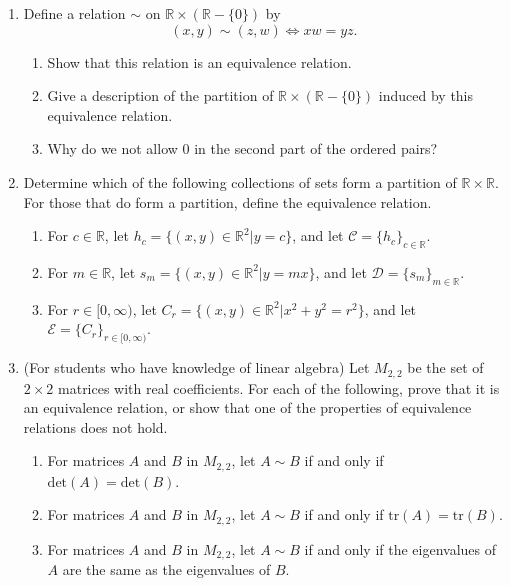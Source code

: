 \documentclass[
]{book}
\providecommand{\tightlist}{%
  \setlength{\itemsep}{0pt}\setlength{\parskip}{0pt}}
\theoremstyle{definition}
\theoremstyle{definition}
\theoremstyle{definition}
\theoremstyle{definition}
\theoremstyle{remark}
\begin{document}
\begin{enumerate}
\def\labelenumi{\arabic{enumi}.}
\item
  Define a relation \(\sim\) on \(\mathbb{R}\times (\mathbb{R}-\{0\})\) by
  \[(x,y) \sim (z,w) \Leftrightarrow xw=yz.\]

  \begin{enumerate}
  \def\labelenumii{\alph{enumii}.}
  \tightlist
  \item
    Show that this relation is an equivalence relation.
  \item
    Give a description of the partition of \(\mathbb{R}\times (\mathbb{R}-\{0\})\) induced by this equivalence relation.
  \item
    Why do we not allow \(0\) in the second part of the ordered pairs?
  \end{enumerate}
\item
  Determine which of the following collections of sets form a partition of \(\mathbb{R}\times \mathbb{R}\). For those that do form a partition, define the equivalence relation.

  \begin{enumerate}
  \def\labelenumii{\alph{enumii}.}
  \tightlist
  \item
    For \(c\in \mathbb{R}\), let \(h_c= \{ (x,y)\in \mathbb{R}^2 \vert y=c\}\), and let \(\mathcal{C} = \{h_c\}_{c\in \mathbb{R}}\).
  \item
    For \(m\in \mathbb{R}\), let \(s_m=\{ (x,y)\in \mathbb{R}^2 \vert y=mx\}\), and let \(\mathcal{D}= \{s_m\}_{m\in \mathbb{R}}\).
  \item
    For \(r\in [0,\infty)\), let \(C_r=\{ (x,y) \in \mathbb{R}^2 \vert x^2+y^2=r^2\}\), and let \(\mathcal{E}=\{C_r\}_{r\in [0,\infty)}\).
  \end{enumerate}
\item
  (For students who have knowledge of linear algebra) Let \(M_{2,2}\) be the set of \(2 \times 2\) matrices with real coefficients. For each of the following, prove that it is an equivalence relation, or show that one of the properties of equivalence relations does not hold.

  \begin{enumerate}
  \def\labelenumii{\alph{enumii}.}
  \tightlist
  \item
    For matrices \(A\) and \(B\) in \(M_{2,2}\), let \(A \sim B\) if and only if \(\mathrm{det}(A)=\mathrm{det}(B)\).
  \item
    For matrices \(A\) and \(B\) in \(M_{2,2}\), let \(A \sim B\) if and only if \(\mathrm{tr}(A)=\mathrm{tr}(B)\).
  \item
    For matrices \(A\) and \(B\) in \(M_{2,2}\), let \(A \sim B\) if and only if the eigenvalues of \(A\) are the same as the eigenvalues of \(B\).
  \end{enumerate}
\end{enumerate}
\end{document}
